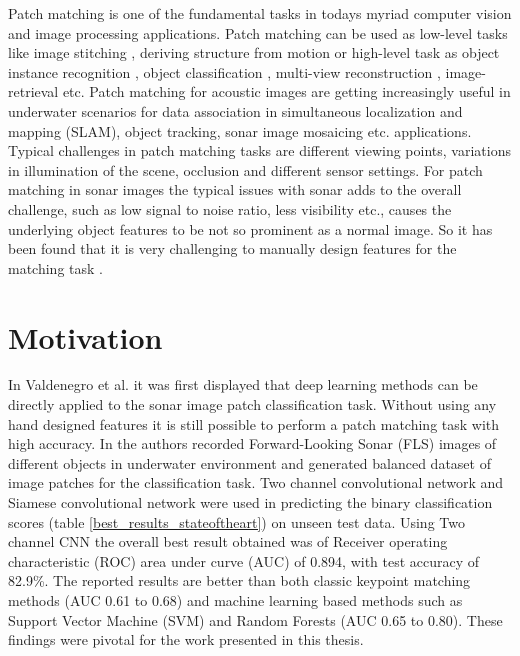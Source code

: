 Patch matching is one of the fundamental tasks in todays myriad computer vision and image processing applications. Patch matching can be used as low-level tasks like image stitching \cite{brown2007automatic}, 
deriving structure from motion \cite{molton2004locally} or high-level task as object instance recognition \cite{lowe1999object}, object classification \cite{yao2012codebook}, multi-view reconstruction \cite{seitz2006comparison}, 
image-retrieval etc. 
Patch matching for acoustic images are getting increasingly useful in underwater scenarios for data association in simultaneous localization and mapping (SLAM), object tracking, sonar image mosaicing \cite{hurtos2012fourier}
etc. applications. Typical challenges in patch matching tasks are different viewing points, variations in illumination of the scene, occlusion and different sensor settings. For patch matching in sonar images the typical issues 
with sonar adds to the overall challenge, such as low signal to noise ratio, less visibility etc., causes the underlying object features to be not so prominent as a normal image. So it has been found that it is very 
challenging to manually design features for the matching task \cite{stateoftheart}. %

\section{Motivation}
\label{sec:motivation}

In Valdenegro et al. \cite{stateoftheart} it was first displayed that deep learning methods can be directly applied to the sonar image patch classification task. Without using any hand designed features it is still possible 
to perform a patch matching task with high accuracy. In \cite{stateoftheart} the authors recorded Forward-Looking Sonar (FLS) images of different objects in underwater environment and generated balanced dataset
of image patches for the classification task.
Two channel convolutional network and Siamese convolutional network were used in predicting the binary classification scores (table \ref{best_results_stateoftheart}) on unseen test data. Using Two channel CNN the overall 
best result obtained was of Receiver operating characteristic (ROC) area under curve (AUC) of 0.894, with test accuracy of 82.9\%. The reported results are
better than both classic keypoint matching methods (AUC 0.61 to 0.68) and machine learning based methods such as Support Vector Machine (SVM) and Random Forests (AUC 0.65 to 0.80). These findings were pivotal for the work presented in this thesis.


